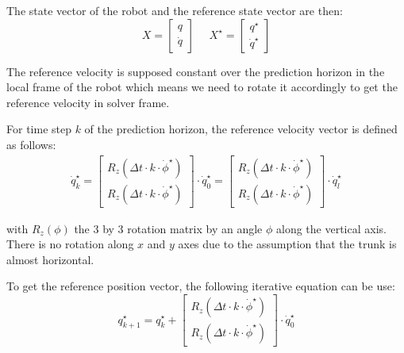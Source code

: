 \documentclass[a4paper,11pt]{article}
\begin{document}
The state vector of the robot and the reference state vector are then: 
\begin{equation}X = \begin{bmatrix} q \\ \dot q \end{bmatrix} \text{~~~~}X^\star = \begin{bmatrix} q^{\star} \\ \dot q^{\star} \end{bmatrix}\end{equation}

The reference velocity is supposed constant over the prediction horizon in the local frame of the robot which means we need to rotate it accordingly to get the reference velocity in solver frame.

For time step $k$ of the prediction horizon, the reference velocity vector is defined as follows:
\begin{align}
\dot q_k^\star = \begin{bmatrix} R_z(\Delta t \cdot k \cdot \dot \phi^\star) \\ R_z(\Delta t \cdot k \cdot \dot \phi^\star) \end{bmatrix}  \cdot  \dot q_0^\star = \begin{bmatrix} R_z(\Delta t \cdot k \cdot \dot \phi^\star) \\ R_z(\Delta t \cdot k \cdot \dot \phi^\star) \end{bmatrix} \cdot \dot q_l^\star 
\end{align}

with $R_z(\phi)$ the 3 by 3 rotation matrix by an angle $\phi$ along the vertical axis. There is no rotation along $x$ and $y$ axes due to the assumption that the trunk is almost horizontal.


To get the reference position vector, the following iterative equation can be use:
\begin{equation} q_{k+1}^\star = q_k^\star + \begin{bmatrix} R_z(\Delta t \cdot k \cdot \dot \phi^\star) \\ R_z(\Delta t \cdot k \cdot \dot \phi^\star) \end{bmatrix} \cdot \dot q_0^\star \end{equation}
\end{document}
